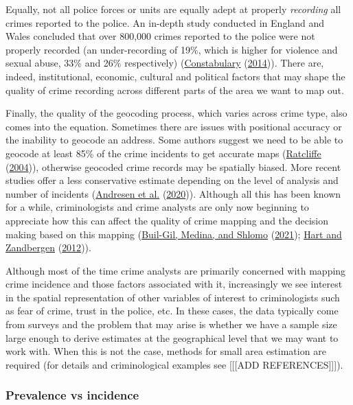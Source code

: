 \documentclass[
]{book}
\begin{document}
Equally, not all police forces or units are equally adept at properly \emph{recording} all crimes reported to the police. An in-depth study conducted in England and Wales concluded that over 800,000 crimes reported to the police were not properly recorded (an under-recording of 19\%, which is higher for violence and sexual abuse, 33\% and 26\% respectively) (\protect\hyperlink{ref-HMIC_2014}{Constabulary} (\protect\hyperlink{ref-HMIC_2014}{2014})). There are, indeed, institutional, economic, cultural and political factors that may shape the quality of crime recording across different parts of the area we want to map out.

Finally, the quality of the geocoding process, which varies across crime type, also comes into the equation. Sometimes there are issues with positional accuracy or the inability to geocode an address. Some authors suggest we need to be able to geocode at least 85\% of the crime incidents to get accurate maps (\protect\hyperlink{ref-Ratcliffe_2004}{Ratcliffe} (\protect\hyperlink{ref-Ratcliffe_2004}{2004})), otherwise geocoded crime records may be spatially biased. More recent studies offer a less conservative estimate depending on the level of analysis and number of incidents (\protect\hyperlink{ref-Andresen_2020}{Andresen et al.} (\protect\hyperlink{ref-Andresen_2020}{2020})). Although all this has been known for a while, criminologists and crime analysts are only now beginning to appreciate how this can affect the quality of crime mapping and the decision making based on this mapping (\protect\hyperlink{ref-Buil-Gil_2021}{Buil-Gil, Medina, and Shlomo} (\protect\hyperlink{ref-Buil-Gil_2021}{2021}); \protect\hyperlink{ref-Hart_2012}{Hart and Zandbergen} (\protect\hyperlink{ref-Hart_2012}{2012})).

Although most of the time crime analysts are primarily concerned with mapping crime incidence and those factors associated with it, increasingly we see interest in the spatial representation of other variables of interest to criminologists such as fear of crime, trust in the police, etc. In these cases, the data typically come from surveys and the problem that may arise is whether we have a sample size large enough to derive estimates at the geographical level that we may want to work with. When this is not the case, methods for small area estimation are required (for details and criminological examples see {[}{[}{[}ADD REFERENCES{]}{]}{]}).

\hypertarget{prevalence-vs-incidence}{%
\subsubsection{Prevalence vs incidence}\label{prevalence-vs-incidence}}
\end{document}

